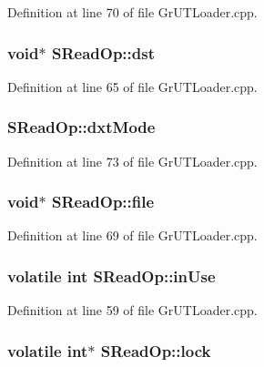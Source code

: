Definition at line 70 of file GrUTLoader.cpp.\hypertarget{struct_s_read_op_2ab52c14ca79eb32510a57b17687277a}{
\subsubsection[{dst}]{\setlength{\rightskip}{0pt plus 5cm}void$\ast$ {\bf SReadOp::dst}}}
\label{struct_s_read_op_2ab52c14ca79eb32510a57b17687277a}




Definition at line 65 of file GrUTLoader.cpp.\hypertarget{struct_s_read_op_8142466165097715bb137171deb0c7ab}{
\subsubsection[{dxtMode}]{ {\bf SReadOp::dxtMode}}}
\label{struct_s_read_op_8142466165097715bb137171deb0c7ab}




Definition at line 73 of file GrUTLoader.cpp.\hypertarget{struct_s_read_op_97f473e8a311f9c61ed81c3360db8f5e}{
\subsubsection[{file}]{\setlength{\rightskip}{0pt plus 5cm}void$\ast$ {\bf SReadOp::file}}}
\label{struct_s_read_op_97f473e8a311f9c61ed81c3360db8f5e}




Definition at line 69 of file GrUTLoader.cpp.\hypertarget{struct_s_read_op_0b63dfe493c6fd53dabbae584ac8ebad}{
\subsubsection[{inUse}]{\setlength{\rightskip}{0pt plus 5cm}volatile int {\bf SReadOp::inUse}}}
\label{struct_s_read_op_0b63dfe493c6fd53dabbae584ac8ebad}




Definition at line 59 of file GrUTLoader.cpp.\hypertarget{struct_s_read_op_4cd669ce61cf52bd17aa2e2ffd0ba3d7}{
\subsubsection[{lock}]{\setlength{\rightskip}{0pt plus 5cm}volatile int$\ast$ {\bf SReadOp::lock}}}
\label{struct_s_read_op_4cd669ce61cf52bd17aa2e2ffd0ba3d7}




